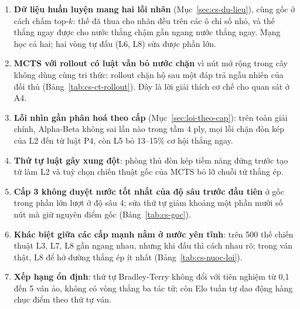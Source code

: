 \begin{enumerate}
\item \textbf{Dữ liệu huấn luyện mang hai lỗi nhãn} (Mục~\ref{sec:cs-du-lieu}), cùng gốc ở cách chấm top-$k$: thế đã thua
cho nhãn đều trên các ô chỉ số nhỏ, và thế thắng ngay được cho nước thắng chậm gần ngang nước thắng ngay. Mạng học cả
hai; hai vòng tự đấu (L6, L8) sửa được phần lớn.
\item \textbf{MCTS với rollout có luật vẫn bỏ nước chặn} vì nút mở rộng trong cây không dùng cùng tri thức: rollout chặn
hộ sau một đáp trả ngẫu nhiên của đối thủ (Bảng~\ref{tab:cs-ct-rollout}). Đây là lời giải thích cơ chế cho quan sát ở A4.
\item \textbf{Lỗi nhìn gần phân hoá theo cấp} (Mục~\ref{sec:loi-theo-cap}): trên toàn giải chính, Alpha-Beta không sai lần
nào trong tầm 4 ply, mọi lỗi chặn đòn kép của L2 đến từ luật P4, còn L5 bỏ 13--15\% cơ hội thắng ngay.
\item \textbf{Thứ tự luật gây xung đột}: phòng thủ đòn kép tiềm năng đứng trước tạo tứ làm L2 và tuỳ chọn chiến thuật gốc
của MCTS bỏ lỡ chuỗi tứ thắng ép.
\item \textbf{Cấp 3 không duyệt nước tốt nhất của độ sâu trước đầu tiên} ở gốc trong phần lớn lượt ở độ sâu 4; sửa thứ tự
giảm khoảng một phần mười số nút mà giữ nguyên điểm gốc (Bảng~\ref{tab:cs-goc}).
\item \textbf{Khác biệt giữa các cấp mạnh nằm ở nước yên tĩnh}: trên 500 thế chiến thuật L3, L7, L8 gần ngang nhau, nhưng
khi đấu thì cách nhau rõ; trong ván thật, L8 để hở đường thắng ép ít nhất (Bảng~\ref{tab:cs-nuoc-loi}).
\item \textbf{Xếp hạng ổn định}: thứ tự Bradley-Terry không đổi với tiên nghiệm từ 0,1 đến 5 ván ảo, không có vòng thắng
ba tác tử; còn Elo tuần tự dao động hàng chục điểm theo thứ tự ván.
\end{enumerate}

